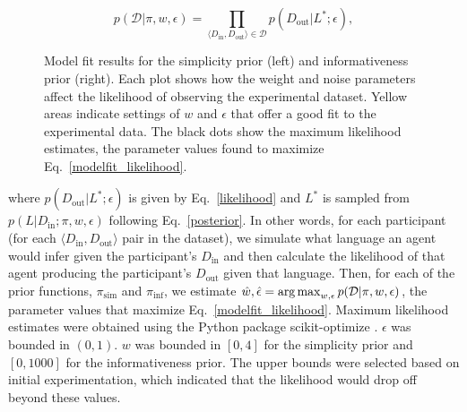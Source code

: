 \documentclass[doc,biblatex]{apa7}
\begin{document}
	\begin{equation}
	p(\mathcal{D} | \pi,w,\epsilon) = \prod_{\langle D_\mathrm{in}, D_\mathrm{out} \rangle \in \mathcal{D}} p(D_\mathrm{out}|L^\ast; \epsilon),
	\label{modelfit_likelihood}
	\end{equation}

	\begin{figure}
	\vspace*{2pt}
	\caption{Model fit results for the simplicity prior (left) and informativeness prior (right). Each plot shows how the weight and noise parameters affect the likelihood of observing the experimental dataset. Yellow areas indicate settings of $w$ and $\epsilon$ that offer a good fit to the experimental data. The black dots show the maximum likelihood estimates, the parameter values found to maximize Eq.~\ref{modelfit_likelihood}.}
	\label{fig13}
	\end{figure}

\noindent where $p(D_\mathrm{out}|L^\ast; \epsilon)$ is given by Eq.~\ref{likelihood} and $L^\ast$ is sampled from $p(L|D_\mathrm{in}; \pi,w,\epsilon)$ following Eq.~\ref{posterior}. In other words, for each participant (for each $\langle D_\mathrm{in}, D_\mathrm{out} \rangle$ pair in the dataset), we simulate what language an agent would infer given the participant's $D_\mathrm{in}$ and then calculate the likelihood of that agent producing the participant's $D_\mathrm{out}$ given that language. Then, for each of the prior functions, $\pi_\mathrm{sim}$ and $\pi_\mathrm{inf}$, we estimate $\hat{w}, \hat{\epsilon} = \operatornamewithlimits{arg\,max}_{w,\epsilon} p(\mathcal{D} | \pi,w,\epsilon)$, the parameter values that maximize Eq.~\ref{modelfit_likelihood}. Maximum likelihood estimates were obtained using the Python package scikit-optimize \parencite{scikitOptimize}. $\epsilon$ was bounded in $(0,1)$. $w$ was bounded in $[0,4]$ for the simplicity prior and $[0,1000]$ for the informativeness prior. The upper bounds were selected based on initial experimentation, which indicated that the likelihood would drop off beyond these values.
\end{document}
